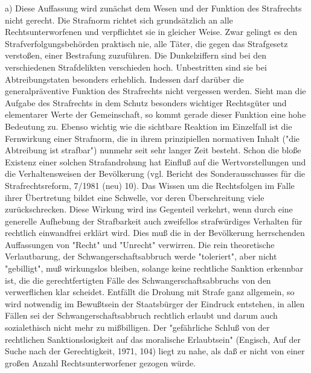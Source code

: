 \documentclass[12pt]{article}
\begin{document}
\syncleft
\begin{sourcepara}
a) Diese Auffassung wird zunächst dem Wesen und der Funktion des Strafrechts nicht gerecht. Die Strafnorm richtet sich grundsätzlich an alle Rechtsunterworfenen und verpflichtet sie in gleicher Weise. Zwar gelingt es den Strafverfolgungsbehörden praktisch nie, alle Täter, die gegen das Strafgesetz verstoßen, einer Bestrafung zuzuführen. Die Dunkelziffern sind bei den verschiedenen Strafdelikten verschieden hoch. Unbestritten sind sie bei Abtreibungstaten besonders erheblich. Indessen darf darüber die generalpräventive Funktion des Strafrechts nicht vergessen werden. Sieht man die Aufgabe des Strafrechts in dem Schutz besonders wichtiger Rechtsgüter und elementarer Werte der Gemeinschaft, so kommt gerade dieser Funktion eine hohe Bedeutung zu. Ebenso wichtig wie die sichtbare Reaktion im Einzelfall ist die Fernwirkung einer Strafnorm, die in ihrem prinzipiellen normativen Inhalt ("die Abtreibung ist strafbar") nunmehr seit sehr langer Zeit besteht. Schon die bloße Existenz einer solchen Strafandrohung hat Einfluß auf die Wertvorstellungen und die Verhaltensweisen der Bevölkerung (vgl. Bericht des Sonderausschusses für die Strafrechtsreform, \abbrBTDrucks{} 7/1981 (neu) \abbrS{} 10). Das Wissen um die Rechtsfolgen im Falle ihrer Übertretung bildet eine Schwelle, vor deren Überschreitung viele zurückschrecken. Diese Wirkung wird ins Gegenteil verkehrt, wenn durch eine generelle Aufhebung der Strafbarkeit auch zweifellos strafwürdiges Verhalten für rechtlich einwandfrei erklärt wird. Dies muß die in der Bevölkerung herrschenden Auffassungen von "Recht" und "Unrecht" verwirren. Die rein theoretische Verlautbarung, der Schwangerschaftsabbruch werde "toleriert", aber nicht "gebilligt", muß wirkungslos bleiben, solange keine rechtliche Sanktion erkennbar ist, die die gerechtfertigten Fälle des Schwangerschaftsabbruchs von den verwerflichen klar scheidet. Entfällt die Drohung mit Strafe ganz allgemein, so wird notwendig im Bewußtsein der Staatsbürger der Eindruck entstehen, in allen Fällen sei der Schwangerschaftsabbruch rechtlich erlaubt und darum auch sozialethisch nicht mehr zu mißbilligen. Der "gefährliche Schluß von der rechtlichen Sanktionslosigkeit auf das moralische Erlaubtsein" (Engisch, Auf der Suche nach der Gerechtigkeit, 1971, \abbrS{} 104) liegt zu nahe, als daß er nicht von einer großen Anzahl Rechtsunterworfener gezogen würde.
\end{sourcepara}
\end{document}
